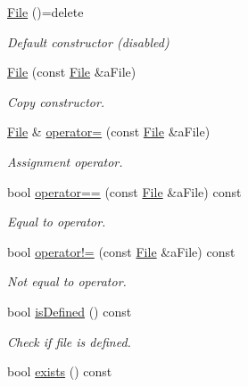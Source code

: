 \begin{DoxyCompactItemize}
\item 
\hyperlink{classlibrary_1_1core_1_1fs_1_1File_a7490060f19a21d4ee58bb6cec87a1ca6}{File} ()=delete
\begin{DoxyCompactList}\small\item\em Default constructor (disabled) \end{DoxyCompactList}\item 
\hyperlink{classlibrary_1_1core_1_1fs_1_1File_a6f3f0d79545ac9984c6f49432f0c6c39}{File} (const \hyperlink{classlibrary_1_1core_1_1fs_1_1File}{File} \&a\+File)
\begin{DoxyCompactList}\small\item\em Copy constructor. \end{DoxyCompactList}\item 
\hyperlink{classlibrary_1_1core_1_1fs_1_1File}{File} \& \hyperlink{classlibrary_1_1core_1_1fs_1_1File_a2bea020568e39a80c69be787418c28ba}{operator=} (const \hyperlink{classlibrary_1_1core_1_1fs_1_1File}{File} \&a\+File)
\begin{DoxyCompactList}\small\item\em Assignment operator. \end{DoxyCompactList}\item 
bool \hyperlink{classlibrary_1_1core_1_1fs_1_1File_a44ab79a23c5a129be298a026dbeec62f}{operator==} (const \hyperlink{classlibrary_1_1core_1_1fs_1_1File}{File} \&a\+File) const
\begin{DoxyCompactList}\small\item\em Equal to operator. \end{DoxyCompactList}\item 
bool \hyperlink{classlibrary_1_1core_1_1fs_1_1File_a0354b6dd59250c07cd5a8b679dc36d95}{operator!=} (const \hyperlink{classlibrary_1_1core_1_1fs_1_1File}{File} \&a\+File) const
\begin{DoxyCompactList}\small\item\em Not equal to operator. \end{DoxyCompactList}\item 
bool \hyperlink{classlibrary_1_1core_1_1fs_1_1File_a2044eecd956aaf55b4c55872485e1bf9}{is\+Defined} () const
\begin{DoxyCompactList}\small\item\em Check if file is defined. \end{DoxyCompactList}\item 
bool \hyperlink{classlibrary_1_1core_1_1fs_1_1File_a61851886b6bf66cd0f179b6c7bd7f972}{exists} () const

\end{DoxyCompactItemize}
